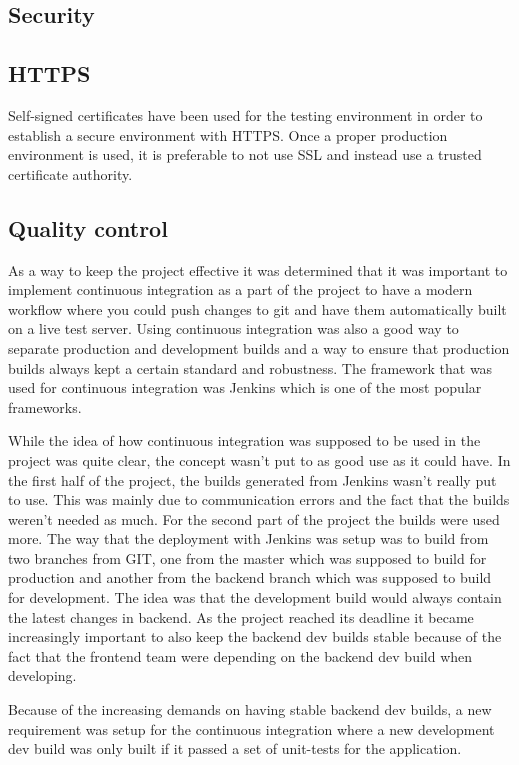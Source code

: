 
\subsection{Security}
\subsection{HTTPS} \label{https}
Self-signed certificates have been used for the testing environment in order to establish a secure environment with HTTPS. Once a proper production environment is used, it is preferable to not use SSL and instead use a trusted certificate authority.
\subsection{Quality control}
As a way to keep the project effective it was determined that it was important to implement continuous integration as a part of the project to have a modern workflow where you could push changes to git and have them automatically built on a live test server. Using continuous integration was also a good way to separate production and development builds and a way to ensure that production builds always kept a certain standard and robustness. The framework that was used for continuous integration was Jenkins which is one of the most popular frameworks.

While the idea of how continuous integration was supposed to be used in the project was quite clear, the concept wasn't put to as good use as it could have. In the first half of the project, the builds generated from Jenkins wasn't really put to use. This was mainly due to communication errors and the fact that the builds weren't needed as much. For the second part of the project the builds were used more. The way that the deployment with Jenkins was setup was to build from two branches from GIT, one from the master which was supposed to build for production and another from the backend branch which was supposed to build for development. The idea was that the development build would always contain the latest changes in backend. As the project reached its deadline it became increasingly important to also keep the backend dev builds stable because of the fact that the frontend team were depending on the backend dev build when developing.

Because of the increasing demands on having stable backend dev builds, a new requirement was setup for the continuous integration where a new development dev build was only built if it passed a set of unit-tests for the application.

